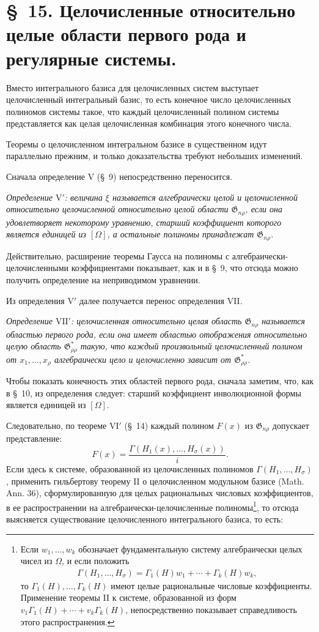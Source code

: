 \documentclass[11pt]{article}
\providecommand{\Gdom}{\mathfrak{G}}
\begin{document}
\section*{\S\ 15. Целочисленные относительно целые области первого рода и регулярные системы.}

Вместо интегрального базиса для целочисленных систем выступает целочисленный интегральный базис, то есть конечное число целочисленных полиномов системы такое, что каждый целочисленный полином системы представляется как целая целочисленная комбинация этого конечного числа.

Теоремы о целочисленном интегральном базисе в существенном идут параллельно прежним, и только доказательства требуют небольших изменений.

Сначала определение V (\S\ 9) непосредственно переносится.

\emph{Определение $\mathrm{V}'$: величина $\xi$ называется алгебраически целой и целочисленной относительно целочисленной относительно целой области $\Gdom_{n\rho}$, если она удовлетворяет некоторому уравнению, старший коэффициент которого является единицей из $[\Omega]$, а остальные полиномы принадлежат $\Gdom_{n\rho}$.}

Действительно, расширение теоремы Гаусса на полиномы с алгебраически-целочисленными коэффициентами показывает, как и в \S\ 9, что отсюда можно получить определение на неприводимом уравнении.

Из определения $\mathrm{V}'$ далее получается перенос определения VII.

\emph{Определение $\mathrm{VII}'$: целочисленная относительно целая область $\Gdom_{n\rho}$ называется областью первого рода, если она имеет областью отображения относительно целую область $\Gdom^*_{\rho\rho}$ такую, что каждый произвольный целочисленный полином от $x_1,\ldots,x_\rho$ алгебраически цело и целочисленно зависит от $\Gdom^*_{\rho\rho}$.}

Чтобы показать конечность этих областей первого рода, сначала заметим, что, как в \S\ 10, из определения следует: старший коэффициент инволюционной формы является единицей из $[\Omega]$.

Следовательно, по теореме $\mathrm{VI}'$ (\S\ 14) каждый полином $F(x)$ из $\Gdom_{n\rho}$ допускает представление:
\[
  F(x)=\frac{\Gamma(H_1(x),\ldots,H_\sigma(x))}{i}.
\]
Если здесь к системе, образованной из целочисленных полиномов $\Gamma(H_1,\ldots,H_\sigma)$, применить гильбертову теорему II о целочисленном модульном базисе (Math. Ann. 36), сформулированную для целых рациональных числовых коэффициентов, в ее распространении на алгебраически-целочисленные полиномы\footnote{Если $w_1,\ldots,w_k$ обозначает фундаментальную систему алгебраически целых чисел из $\Omega$, и если положить
\[
\begin{gathered}
  \Gamma(H_1,\ldots,H_\sigma)
  =\Gamma_1(H)w_1+\cdots+\Gamma_k(H)w_k,
\end{gathered}
\]
то $\Gamma_1(H),\ldots,\Gamma_k(H)$ имеют целые рациональные числовые коэффициенты. Применение теоремы II к системе, образованной из форм $v_1\Gamma_1(H)+\cdots+v_k\Gamma_k(H)$, непосредственно показывает справедливость этого распространения.}, то отсюда выясняется существование целочисленного интегрального базиса, то есть:
\end{document}
